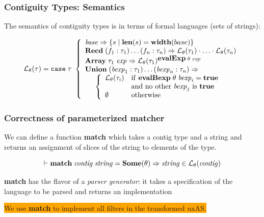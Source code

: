 \documentclass{beamer}
\newcommand{\imp}{\Rightarrow}
\newcommand{\konst}[1]{\ensuremath{\mbox{\bf{#1}}}}
\newcommand{\set}[1]{\{ {#1} \}}
\newcommand{\LangTheta}[1]{\ensuremath{{\mathcal L}_{\theta}({#1})}}
\begin{document}
\begin{frame}[fragile]\frametitle{Contiguity Types: Semantics}

The semantics of contiguity types is in terms of formal languages
(sets of strings):

\[
\LangTheta{\tau} =
\mathtt{case}\; \tau\
 \left\{
 \begin{array}{l}
 \mathit{base} \Rightarrow \set{s \mid \konst{len}(s) = \konst{width}(base)} \\
 \konst{Recd}\; (f_1 : \tau_1) \ldots (f_n : \tau_n)
      \Rightarrow \LangTheta{\tau_1} \cdot \ldots \cdot \LangTheta{\tau_n}
\\
 \konst{Array}\; \tau_1 \; \mathit{exp}
      \Rightarrow  \LangTheta{\tau_1}^{\konst{evalExp}\;\theta\;\mathit{exp}}
\\
 \konst{Union}\; (\mathit{bexp}_1 : \tau_1) \ldots (\mathit{bexp}_n : \tau_n) \Rightarrow \\
  \hspace*{5mm}
 \left\{
 \begin{array}{ll}
    \LangTheta{\tau_i} &  \mathrm{if}\ \konst{evalBexp}\;\theta\;\mathit{bexp}_i = \konst{true} \\
                  & \mathrm{and\ no\ other}\ \mathit{bexp}_j\ \mathrm{is}\ \konst{true}  \\
    \emptyset & \mathrm{otherwise}
 \end{array}
 \right.
 \\
\end{array}
 \right.
\]
\end{frame}

\begin{frame}[fragile]\frametitle{Correctness of parameterized matcher}

We can define a function \textbf{match} which takes a contig type and
a string and returns an assignment of slices of the string to elements of the type.

\begin{theorem}[Correctness]
  \[
 \vdash \konst{match}\; \mathit{contig}\; \mathit{string} = \konst{Some}(\theta) \imp
   \mathit{string} \in \LangTheta{\mathit{contig}}
\]
\end{theorem}

\textbf{match} has the flavor of a \emph{parser generator}: it takes a
specification of the language to be parsed and returns an implementation

\colorbox{orange}{We use \textbf{match} to implement all filters in
  the transformed uxAS.}

\end{frame}
\end{document}
